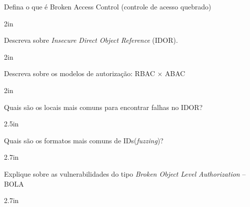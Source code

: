 \documentclass[12pt]{exam}
\begin{document}
	\begin{questions}
	\question Defina o que é Broken Access Control (controle de acesso quebrado)
\begin{solutionbox}{2in}
\end{solutionbox}

\question Descreva sobre \textit{Insecure Direct Object Reference} (IDOR).
\begin{solutionbox}{2in}
\end{solutionbox}


\question Descreva sobre os modelos de autorização: RBAC $\times$ ABAC
\begin{solutionbox}{2in}
\end{solutionbox}


\question Quais são os locais mais comuns para encontrar falhas no IDOR? 
\begin{solutionbox}{2.5in}
\end{solutionbox}

\question Quais são os formatos mais comuns de IDs(\textit{fuzzing})?
\begin{solutionbox}{2.7in}
\end{solutionbox}

\question Explique sobre as vulnerabilidades do tipo \textit{Broken Object Level Authorization} -- BOLA 

\begin{solutionbox}{2.7in}\end{solutionbox}


%
	

	\end{questions}
	
\end{document}
